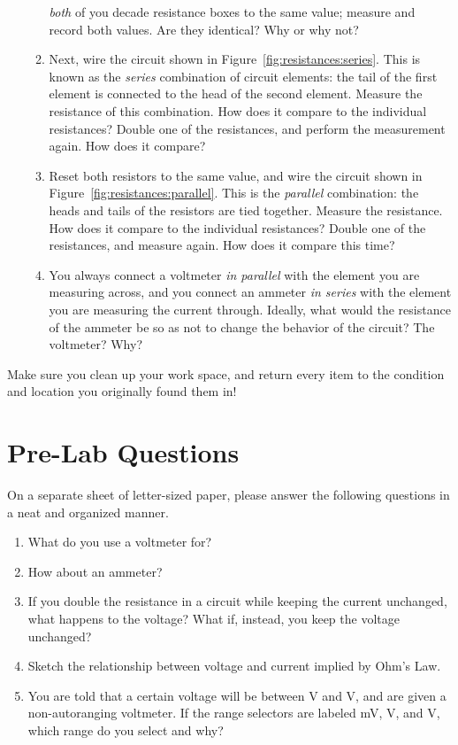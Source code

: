 \documentclass[12pt]{article}
\begin{document}
\begin{enumerate}
\begin{enumerate}
    \textit{both} of you decade resistance boxes to the same value;
    measure and record both values.  Are they identical?  Why or why
    not? 
  \item \label{item:series} Next, wire the circuit shown in
    Figure~\ref{fig:resistances:series}.  This is known as the
    \textit{series} combination of circuit elements: the tail of the
    first element is connected to the head of the second element.
    Measure the resistance of this combination.  How does it compare
    to the individual resistances?  Double one of the resistances, and
    perform the measurement again.  How does it compare?
  \item \label{item:parallel} Reset both resistors to the same value,
    and wire the circuit shown in
    Figure~\ref{fig:resistances:parallel}.  This is the
    \textit{parallel} combination: the heads and tails of the
    resistors are tied together.  Measure the resistance.  How does it
    compare to the individual resistances?  Double one of the
    resistances, and measure again.  How does it compare this time?
  \item You always connect a voltmeter \textit{in parallel} with the
    element you are measuring across, and you connect an ammeter
    \textit{in series} with the element you are measuring the current
    through.  Ideally, what would the resistance of the ammeter be so
    as not to change the behavior of the circuit?  The voltmeter?
    Why? 
  \end{enumerate}
\end{enumerate}

Make sure you clean up your work space, and return every item to the
condition and location you originally found them in!

\newpage

\section*{Pre-Lab Questions}

On a separate sheet of letter-sized paper, please answer the following
questions in a neat and organized manner.  

\begin{enumerate}
\item What do you use a voltmeter for?
\item How about an ammeter?
\item If you double the resistance in a circuit while keeping the
  current unchanged, what happens to the voltage?  What if, instead,
  you keep the voltage unchanged?
\item Sketch the relationship between voltage and current implied by
  Ohm's Law.
\item You are told that a certain voltage will be between \unit[3]{V}
  and \unit[5]{V}, and are given a non-autoranging voltmeter.  If the
  range selectors are labeled \unit[200]{mV}, \unit[2]{V}, and
  \unit[20]{V}, which range do you select and why?
\end{enumerate}
\end{document}
